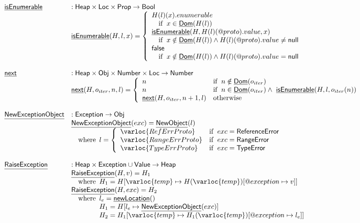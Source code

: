 \[
\begin{array}{ll}
\chf{isEnumerable} & : \SF{Heap} \times \SF{Loc} \times \SF{Prop} \rightarrow \SF{Bool} \\
& \chf{isEnumerable}(H,l,x) =
  \left\{
    \begin{array}{l}
      H(l)(x).enumerable \\
      \quad\ifc{x\in\chf{Dom}(H(l))} \\
      \chf{isEnumerable}(H,H(l)(\varprop{proto}).value,x) \\
      \quad\ifc{x\notin\chf{Dom}(H(l)) \land H(l)(\varprop{proto}).value \neq \SF{null}} \\
      \vfalse \\
      \quad\ifc{x\notin\chf{Dom}(H(l)) \land H(l)(\varprop{proto}).value = \SF{null}} \\
    \end{array}
  \right.\\
\\
\chf{next} & : \SF{Heap} \times \SF{Obj} \times \SF{Number} \times \SF{Loc} \rightarrow \SF{Number} \\
& \chf{next}(H,o_{iter},n,l) = 
  \left\{
  \begin{array}{ll}
    n &\ifc{n\notin \chf{Dom}(o_{iter})} \\
    n &\ifc{n\in \chf{Dom}(o_{iter})
      \land\ \chf{isEnumerable}(H,l,o_{iter}(n))} \\
    \chf{next}(H,o_{iter},n+1,l) & \owc\\
  \end{array}
  \right.\\
\\
\chf{NewExceptionObject} & : \SF{Exception} \rightarrow \SF{Obj} \\
& \chf{NewExceptionObject}(exc) = \chf{NewObject}(l)\\
& \quad\wherec{
  l=\left\{
    \begin{array}{ll}
      \varloc{RefErrProto}&\ifc{exc = \exc{ReferenceError}} \\
      \varloc{RangeErrProto}&\ifc{exc = \exc{RangeError}} \\
      \varloc{TypeErrProto}&\ifc{exc = \exc{TypeError}} \\
    \end{array}
  \right.
}\\\\
\chf{RaiseException} & : \SF{Heap} \times \SF{Exception}\cup\SF{Value} \rightarrow \SF{Heap} \\
& \chf{RaiseException}(H,v) = H_1 \\
& \quad\wherec{
  H_1 = H[\varloc{temp}\mapsto H(\varloc{temp})[\varprop{exception}\mapsto v]]
}\\
& \chf{RaiseException}(H,exc) = H_2 \\
& \quad\wherec{
  l_e = \chf{newLocation}() \\
  H_1 = H[l_e\mapsto\chf{NewExceptionObject}(exc)] \\
  H_2 = H_1[\varloc{temp}\mapsto H_1(\varloc{temp})[\varprop{exception}\mapsto l_{e}]]
}
\end{array}
\]
